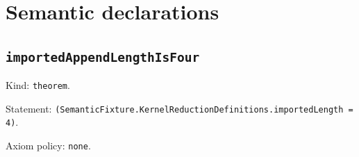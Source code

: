 \documentclass[11pt]{article}
\begin{document}
\section*{Semantic declarations}
\subsection*{\texttt{importedAppendLengthIsFour}}
\noindent Kind: \texttt{theorem}.\par
\noindent Statement: \texttt{(SemanticFixture.KernelReductionDefinitions.importedLength = 4)}.\par
\noindent Axiom policy: \texttt{none}.\par
\end{document}
